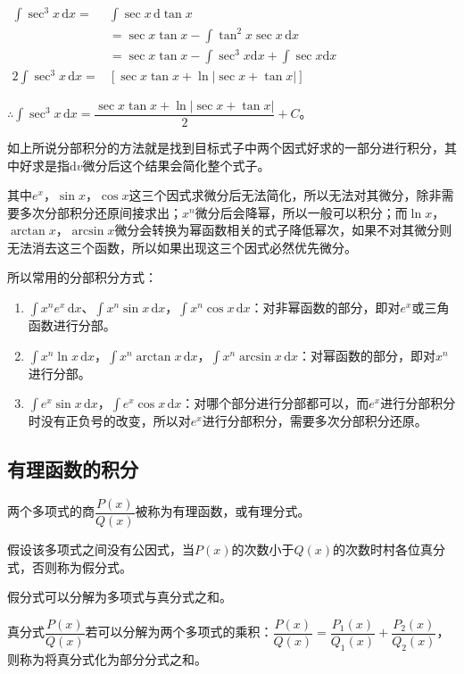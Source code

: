 \documentclass[UTF8, 12pt]{ctexart}
\begin{document}
$
\begin{aligned}
    \int\sec^3x\,\textrm{d}x =&\int\sec x\,\textrm{d}\tan x \\
    & =\sec x\tan x-\int\tan^2x\sec x\,\textrm{d}x \\
    & =\sec x\tan x-\int\sec^3x\textrm{d}x+\int\sec x\textrm{d}x \\
    2\int\sec^3x\,\textrm{d}x =&[\sec x\tan x+\ln\vert\sec x+\tan x\vert]
\end{aligned}
$

$\therefore\int\sec^3x\,\textrm{d}x =\dfrac{\sec x\tan x+\ln\vert\sec x+\tan x\vert}{2}+C$。

如上所说分部积分的方法就是找到目标式子中两个因式好求的一部分进行积分，其中好求是指$\textrm{d}v$微分后这个结果会简化整个式子。

其中$e^x$，$\sin x$，$\cos x$这三个因式求微分后无法简化，所以无法对其微分，除非需要多次分部积分还原间接求出；$x^n$微分后会降幂，所以一般可以积分；而$\ln x$，$\arctan x$，$\arcsin x$微分会转换为幂函数相关的式子降低幂次，如果不对其微分则无法消去这三个函数，所以如果出现这三个因式必然优先微分。

所以常用的分部积分方式：

\begin{enumerate}
    \item $\int x^ne^x\,\textrm{d}x$、$\int x^n\sin x\,\textrm{d}x$，$\int x^n\cos x\,\textrm{d}x$：对非幂函数的部分，即对$e^x$或三角函数进行分部。
    \item $\int x^n\ln x\,\textrm{d}x$，$\int x^n\arctan x\,\textrm{d}x$，$\int x^n\arcsin x\,\textrm{d}x$：对幂函数的部分，即对$x^n$进行分部。
    \item $\int e^x\sin x\,\textrm{d}x$，$\int e^x\cos x\,\textrm{d}x$：对哪个部分进行分部都可以，而$e^x$进行分部积分时没有正负号的改变，所以对$e^x$进行分部积分，需要多次分部积分还原。
\end{enumerate}

\subsection{有理函数的积分}

两个多项式的商$\dfrac{P(x)}{Q(x)}$被称为有理函数，或有理分式。

假设该多项式之间没有公因式，当$P(x)$的次数小于$Q(x)$的次数时村各位真分式，否则称为假分式。

假分式可以分解为多项式与真分式之和。

真分式$\dfrac{P(x)}{Q(x)}$若可以分解为两个多项式的乘积：$\dfrac{P(x)}{Q(x)}=\dfrac{P_1(x)}{Q_1(x)}+\dfrac{P_2(x)}{Q_2(x)}$，则称为将真分式化为部分分式之和。
\end{document}

